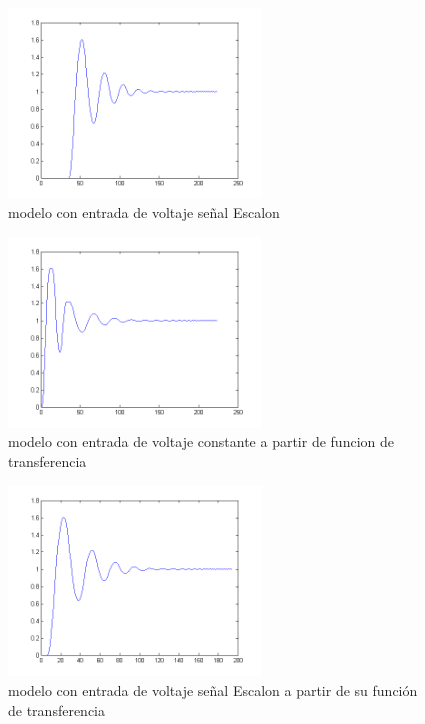 \documentclass[]{article}
\begin{document}
\begin{figure}[h!]
	\centering
	\includegraphics[width=0.6\textwidth]{modeloEscalon.png}
	\caption{modelo con entrada de voltaje señal Escalon}
	\label{fig:modeloEscalon}
\end{figure}

\begin{figure}[h!]
	\centering
	\includegraphics[width=0.6\textwidth]{modelo2Const.png}
	\caption{modelo con entrada de voltaje constante a partir de funcion de transferencia}
	\label{fig:modelo2Const}
\end{figure}

\begin{figure}[h!]
	\centering
	\includegraphics[width=0.6\textwidth]{modelo2Escalon.png}
	\caption{modelo con entrada de voltaje señal Escalon a partir de su función de transferencia}
	\label{fig:modelo2Escalon}
\end{figure}
\end{document}
